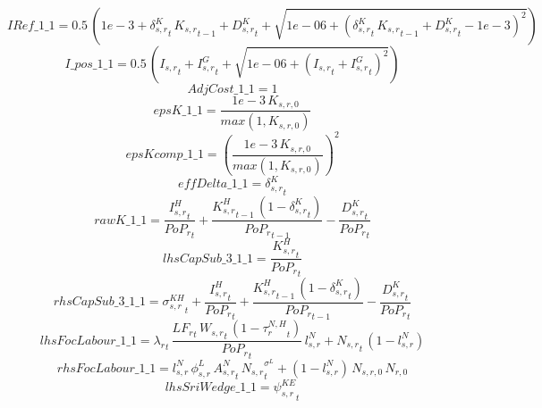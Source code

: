 \begin{dmath*}
IRef\_1\_1 = 0.5\, \left(1e-3+{{\delta^{K}_{s,r}}}_{t}\, {{K_{s,r}}}_{t-1}+{{D^K_{s,r}}}_{t}+\sqrt{1e-06+\left({{\delta^{K}_{s,r}}}_{t}\, {{K_{s,r}}}_{t-1}+{{D^K_{s,r}}}_{t}-1e-3\right)^{2}}\right)
\end{dmath*}
\begin{dmath*}
I\_pos\_1\_1 = 0.5\, \left({{I_{s,r}}}_{t}+{{I^G_{s,r}}}_{t}+\sqrt{1e-06+\left({{I_{s,r}}}_{t}+{{I^G_{s,r}}}_{t}\right)^{2}}\right)
\end{dmath*}
\begin{dmath*}
AdjCost\_1\_1 = 1
\end{dmath*}
\begin{dmath*}
epsK\_1\_1 = \frac{1e-3\, {{K_{s,r,0}}}}{max(1,{{K_{s,r,0}}})}
\end{dmath*}
\begin{dmath*}
epsKcomp\_1\_1 = \left(\frac{1e-3\, {{K_{s,r,0}}}}{max(1,{{K_{s,r,0}}})}\right)^{2}
\end{dmath*}
\begin{dmath*}
effDelta\_1\_1 = {{\delta^{K}_{s,r}}}_{t}
\end{dmath*}
\begin{dmath*}
rawK\_1\_1 = \frac{{{I^H_{s,r}}}_{t}}{{{PoP_r}}_{t}}+\frac{{{K^H_{s,r}}}_{t-1}\, \left(1-{{\delta^{K}_{s,r}}}_{t}\right)}{{{PoP_r}}_{t-1}}-\frac{{{D^K_{s,r}}}_{t}}{{{PoP_r}}_{t}}
\end{dmath*}
\begin{dmath*}
lhsCapSub\_3\_1\_1 = \frac{{{K^H_{s,r}}}_{t}}{{{PoP_r}}_{t}}
\end{dmath*}
\begin{dmath*}
rhsCapSub\_3\_1\_1 = {{\sigma^{KH}_{s,r}}}_{t}+\frac{{{I^H_{s,r}}}_{t}}{{{PoP_r}}_{t}}+\frac{{{K^H_{s,r}}}_{t-1}\, \left(1-{{\delta^{K}_{s,r}}}_{t}\right)}{{{PoP_r}}_{t-1}}-\frac{{{D^K_{s,r}}}_{t}}{{{PoP_r}}_{t}}
\end{dmath*}
\begin{dmath*}
lhsFocLabour\_1\_1 = {\lambda_r}_{t}\, \frac{{{LF_r}}_{t}\, {{W_{s,r}}}_{t}\, \left(1-{{\tau^{N,H}_{r}}}_{t}\right)}{{{PoP_r}}_{t}}\, {{l^{N}_{s,r}}}+{{N_{s,r}}}_{t}\, \left(1-{{l^{N}_{s,r}}}\right)
\end{dmath*}
\begin{dmath*}
rhsFocLabour\_1\_1 = {{l^{N}_{s,r}}}\, {{\phi^{L}_{s,r}}}\, {{A^{N}_{s,r}}}_{t}\, {{N_{s,r}}}_{t}^{{{\sigma^{L}}}}+\left(1-{{l^{N}_{s,r}}}\right)\, {{N_{s,r,0}}}\, {{N_{r,0}}}
\end{dmath*}
\begin{dmath*}
lhsSriWedge\_1\_1 = {{\psi^{KE}_{s,r}}}_{t}
\end{dmath*}

